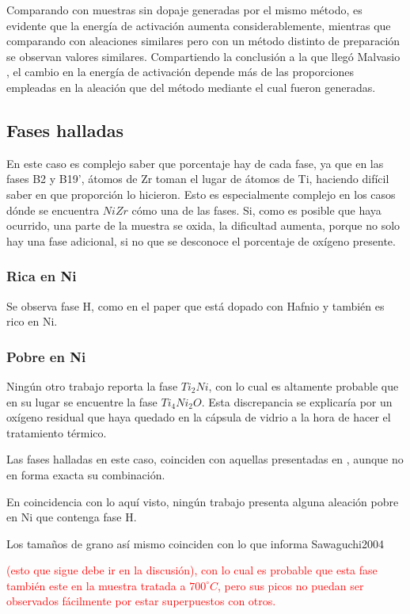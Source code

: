 \documentclass[12pt]{article}
\theoremstyle{definition}
\theoremstyle{remark}
\begin{document}
{Comparando con muestras sin dopaje generadas por el mismo método, es evidente que la energía de activación aumenta considerablemente, mientras que comparando con aleaciones similares pero con un método distinto de preparación se observan valores similares. Compartiendo la conclusión a la que llegó Malvasio \cite{Malvasio}, el cambio en la energía de activación depende más de las proporciones empleadas en la aleación que del método mediante el cual fueron generadas.

\subsection{Fases halladas}
En este caso es complejo saber que porcentaje hay de cada fase, ya que en las fases B2 y B19', átomos de Zr toman el lugar de átomos de Ti, haciendo difícil saber en que proporción lo hicieron. Esto es especialmente complejo en los casos dónde se encuentra $NiZr$ cómo una de las fases. Si, como es posible que haya ocurrido, una parte de la muestra se oxida, la dificultad aumenta, porque no solo hay una fase adicional, si no que se desconoce el porcentaje de oxígeno presente.


\subsubsection{Rica en Ni}
Se observa fase H, como en el paper que está dopado con Hafnio y también es rico en Ni.

\subsubsection{Pobre en Ni}
\label{DPobreNi}

Ningún otro trabajo reporta la fase $Ti_2Ni$, con lo cual es altamente probable que en su lugar se encuentre la fase $Ti_4Ni_2O$. Esta discrepancia se explicaría por un oxígeno residual que haya quedado en la cápsula de vidrio a la hora de hacer el tratamiento térmico.

Las fases halladas en este caso, coinciden con aquellas presentadas en , aunque no en forma exacta su combinación.

En coincidencia con lo aquí visto, ningún trabajo presenta alguna aleación pobre en Ni que contenga fase H.

Los tamaños de grano así mismo coinciden con lo que informa Sawaguchi2004

\textcolor{red}{(esto que sigue debe ir en la discusión), con lo cual es probable que esta fase también este en la muestra tratada a $700 ^\circ C$, pero sus picos no puedan ser observados fácilmente por estar superpuestos con otros.}

}
\end{document}
